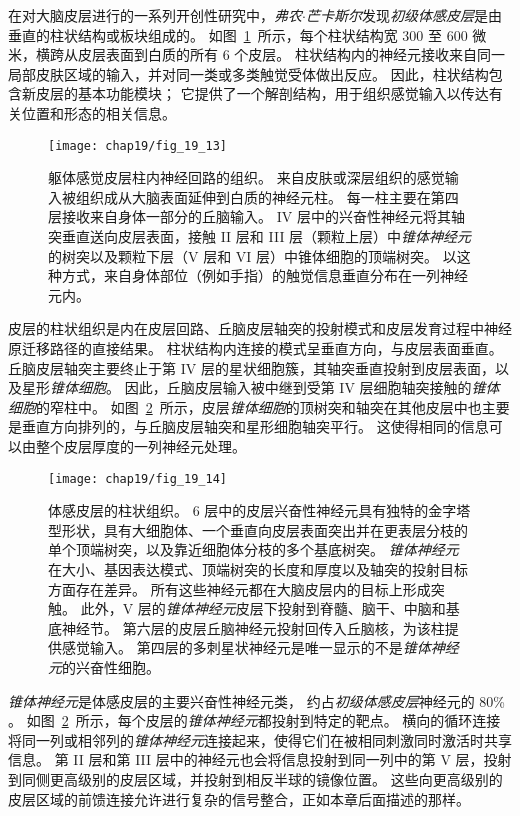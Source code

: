 在对大脑皮层进行的一系列开创性研究中，\textit{弗农$\cdot$芒卡斯尔}发现\textit{初级体感皮层}是由垂直的柱状结构或板块组成的。
如图~\ref{fig:19_13}~所示，每个柱状结构宽 300 至 600 微米，横跨从皮层表面到白质的所有 6 个皮层。
柱状结构内的神经元接收来自同一局部皮肤区域的输入，并对同一类或多类触觉受体做出反应。
因此，柱状结构包含新皮层的基本功能模块；
它提供了一个解剖结构，用于组织感觉输入以传达有关位置和形态的相关信息。


\begin{figure}[htbp]
	\centering
	\texttt{[image: chap19/fig\_19\_13]}
	\caption{躯体感觉皮层柱内神经回路的组织。
		来自皮肤或深层组织的感觉输入被组织成从大脑表面延伸到白质的神经元柱。
		每一柱主要在第四层接收来自身体一部分的丘脑输入。
		IV 层中的兴奋性神经元将其轴突垂直送向皮层表面，接触 II 层和 III 层（颗粒上层）中\textit{锥体神经元}的树突以及颗粒下层（V 层和 VI 层）中锥体细胞的顶端树突。
		以这种方式，来自身体部位（例如手指）的触觉信息垂直分布在一列神经元内。}
	\label{fig:19_13}
\end{figure}


皮层的柱状组织是内在皮层回路、丘脑皮层轴突的投射模式和皮层发育过程中神经原迁移路径的直接结果。
柱状结构内连接的模式呈垂直方向，与皮层表面垂直。
丘脑皮层轴突主要终止于第 IV 层的星状细胞簇，其轴突垂直投射到皮层表面，以及星形\textit{锥体细胞}。
因此，丘脑皮层输入被中继到受第 IV 层细胞轴突接触的\textit{锥体细胞}的窄柱中。
如图~\ref{fig:19_14}~所示，皮层\textit{锥体细胞}的顶树突和轴突在其他皮层中也主要是垂直方向排列的，与丘脑皮层轴突和星形细胞轴突平行。
这使得相同的信息可以由整个皮层厚度的一列神经元处理。


\begin{figure}[htbp]
	\centering
	\texttt{[image: chap19/fig\_19\_14]}
	\caption{体感皮层的柱状组织。
		6 层中的皮层兴奋性神经元具有独特的金字塔型形状，具有大细胞体、一个垂直向皮层表面突出并在更表层分枝的单个顶端树突，以及靠近细胞体分枝的多个基底树突。
		\textit{锥体神经元}在大小、基因表达模式、顶端树突的长度和厚度以及轴突的投射目标方面存在差异。
		所有这些神经元都在大脑皮层内的目标上形成突触。
		此外，V 层的\textit{锥体神经元}皮层下投射到脊髓、脑干、中脑和基底神经节。
		第六层的皮层丘脑神经元投射回传入丘脑核，为该柱提供感觉输入。
		第四层的多刺星状神经元是唯一显示的不是\textit{锥体神经元}的兴奋性细胞\cite{oberlaender2012cell}。}
	\label{fig:19_14}
\end{figure}


\textit{锥体神经元}是体感皮层的主要兴奋性神经元类，
约占\textit{初级体感皮层}神经元的 80\% 。 
如图~\ref{fig:19_14}~所示，每个皮层的\textit{锥体神经元}都投射到特定的靶点。
横向的循环连接将同一列或相邻列的\textit{锥体神经元}连接起来，使得它们在被相同刺激同时激活时共享信息。
第 II 层和第 III 层中的神经元也会将信息投射到同一列中的第 V 层，投射到同侧更高级别的皮层区域，并投射到相反半球的镜像位置。
这些向更高级别的皮层区域的前馈连接允许进行复杂的信号整合，正如本章后面描述的那样。


